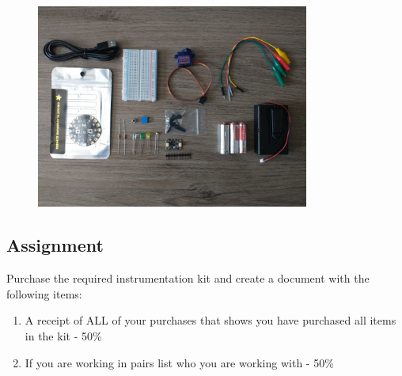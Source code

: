 \begin{figure}[H]
  \begin{center}
    \includegraphics[width=0.8\textwidth]{Figures/components.png}
  \end{center}
\end{figure}

\subsection{Assignment}
Purchase the required instrumentation kit and create a document with the following items:
\begin{enumerate}[itemsep=-5pt]
\item A receipt of ALL of your purchases that shows you have purchased all items in the kit - 50\%
\item If you are working in pairs list who you are working with - 50\%
\end{enumerate}


